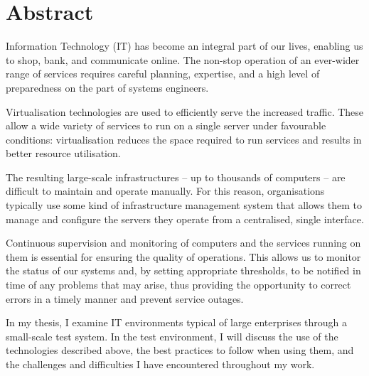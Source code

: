 \chapter*{Abstract}

Information Technology (IT) has become an integral part of our lives, enabling us to shop, bank, and communicate online. The non-stop operation of an ever-wider range of services requires careful planning, expertise, and a high level of preparedness on the part of systems engineers.

Virtualisation technologies are used to efficiently serve the increased traffic. These allow a wide variety of services to run on a single server under favourable conditions: virtualisation reduces the space required to run services and results in better resource utilisation.

The resulting large-scale infrastructures -- up to thousands of computers -- are difficult to maintain and operate manually. For this reason, organisations typically use some kind of infrastructure management system that allows them to manage and configure the servers they operate from a centralised, single interface.

Continuous supervision and monitoring of computers and the services running on them is essential for ensuring the quality of operations. This allows us to monitor the status of our systems and, by setting appropriate thresholds, to be notified in time of any problems that may arise, thus providing the opportunity to correct errors in a timely manner and prevent service outages.

In my thesis, I examine IT environments typical of large enterprises through a small-scale test system. In the test environment, I will discuss the use of the technologies described above, the best practices to follow when using them, and the challenges and difficulties I have encountered throughout my work.


\vfill
\selectthesislanguage

\setcounter{romanPage}{\value{page}}
